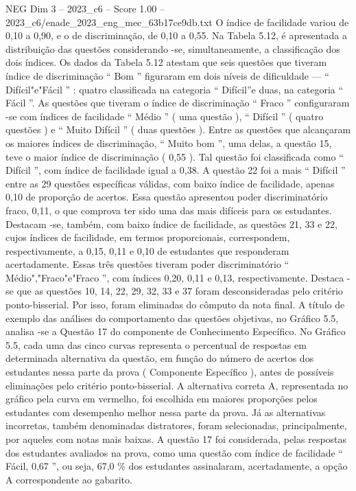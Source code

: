 \begin{textsample}{NEG Dim 3 – 2023\_c6 – Score 1.00 – 2023\_c6/enade\_2023\_eng\_mec\_63b17ce9db.txt}
O índice de facilidade variou de 0,10 a 0,90, e o de discriminação, de 0,10 a 0,55.
Na Tabela 5.12, é apresentada a distribuição das questões considerando -se, simultaneamente, a classificação dos dois índices.
Os dados da Tabela 5.12 atestam que seis questões que tiveram índice de discriminação “ Bom ” figuraram em dois níveis de dificuldade — “ Difícil"e"Fácil ” : quatro classificada na categoria “ Difícil”e duas, na categoria “ Fácil ”.
As questões que tiveram o índice de discriminação “ Fraco ” configuraram -se com índices de facilidade “ Médio ” ( uma questão ), “ Difícil ” ( quatro questões ) e “ Muito Difícil ” ( duas questões ).
Entre as questões que alcançaram os maiores índices de discriminação, “ Muito bom ”, uma delas, a questão 15, teve o maior índice de discriminação ( 0,55 ).
Tal questão foi classificada como “ Difícil ”, com índice de facilidade igual a 0,38.
A questão 22 foi a mais “ Difícil ” entre as 29 questões específicas válidas, com baixo índice de facilidade, apenas 0,10 de proporção de acertos.
Essa questão apresentou poder discriminatório fraco, 0,11, o que comprova ter sido uma das mais difíceis para os estudantes.
Destacam -se, também, com baixo índice de facilidade, as questões 21, 33 e 22, cujos índices de facilidade, em termos proporcionais, correspondem, respectivamente, a 0,15, 0,11 e 0,10 de estudantes que responderam acertadamente.
Essas três questões tiveram poder discriminatório “ Médio","Fraco"e"Fraco ”, com índices 0,20, 0,11 e 0,13, respectivamente.
Destaca -se que as questões 10, 14, 22, 29, 32, 33 e 37 foram desconsideradas pelo critério ponto-bisserial.
Por isso, foram eliminadas do cômputo da nota final.
A título de exemplo das análises do comportamento das questões objetivas, no Gráfico 5.5, analisa -se a Questão 17 do componente de Conhecimento Específico.
No Gráfico 5.5, cada uma das cinco curvas representa o percentual de respostas em determinada alternativa da questão, em função do número de acertos dos estudantes nessa parte da prova ( Componente Específico ), antes de possíveis eliminações pelo critério ponto-bisserial.
A alternativa correta A, representada no gráfico pela curva em vermelho, foi escolhida em maiores proporções pelos estudantes com desempenho melhor nessa parte da prova.
Já as alternativas incorretas, também denominadas distratores, foram selecionadas, principalmente, por aqueles com notas mais baixas.
A questão 17 foi considerada, pelas respostas dos estudantes avaliados na prova, como uma questão com índice de facilidade “ Fácil, 0,67 ”, ou seja, 67,0 \% dos estudantes assinalaram, acertadamente, a opção A correspondente ao gabarito.

\end{textsample}
